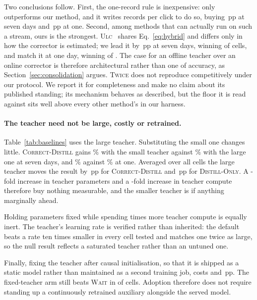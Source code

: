 Two conclusions follow. First, the one-record rule is inexpensive: only
\textsc{\bestNonSeven} outperforms our method, and it writes \vanillaDup{} records per click
to do so, buying \priceSeven{}\,pp at seven days and \priceOne{}\,pp at one. Second, among methods that can
actually run on such a stream, ours is the strongest.
\textsc{Ulc}~\cite{wang2023unbiased} shares Eq.~\eqref{eq:hybrid} and differs only in how the
corrector is estimated; we lead it by \ourUlcSeven{}\,pp at seven days, winning
\ourUlcWinSeven{} of \nCells{} cells, and match it at one day, winning \ourUlcWinOne{} of
\nCells{}. The case for an offline teacher over an online corrector is therefore architectural
rather than one of accuracy, as Section~\ref{sec:consolidation} argues. \textsc{Twice} does not
reproduce competitively under our protocol. We report it for completeness and make no claim
about its published standing; its mechanism behaves as described, but the floor it is read
against sits well above every other method's in our harness.

\paragraph{The teacher need not be large, costly or retrained.}
Table~\ref{tab:baselines} uses the large teacher. Substituting the small one changes little.
\textsc{Correct-Distill} gains \tchSmallCdSevenAbs{}\% with the small teacher against
\tchLargeCdSevenAbs{}\% with the large one at seven days, and \tchSmallCdOneAbs{}\% against
\tchLargeCdOneAbs{}\% at one. Averaged over all \nCellsBoth{} cells the large teacher moves the
result by \teachCdMean{}\,pp for \textsc{Correct-Distill} and \teachDoMean{}\,pp for
\textsc{Distill-Only}. A \teacherRatio{}-fold increase in teacher parameters and a
\teacherFlopRatio{}-fold increase in teacher compute therefore buy nothing measurable, and the
smaller teacher is if anything marginally ahead.

Holding parameters fixed while spending \wideFlopRatio{} times more teacher compute is equally
inert. The teacher's learning rate is verified rather than inherited: the default beats a
rate ten times smaller in every cell tested and matches one twice as large, so the null result
reflects a saturated teacher rather than an untuned one.

Finally, fixing the teacher after causal initialisation, so that it is shipped as a static model
rather than maintained as a second training job, costs \frzCostOneAbs{} and
\frzCostSevenAbs{}\,pp. The fixed-teacher arm still beats \textsc{Wait} in \frzBeat{} of
\frzN{} cells. Adoption therefore does not require standing up a continuously retrained
auxiliary alongside the served model.
